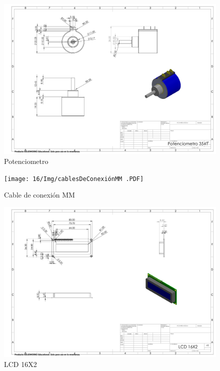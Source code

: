     \begin{figure}[H]
        \centering
        \includegraphics[trim = {10mm 10mm 10mm 10mm},clip,scale=0.150]{16/Img/potenciometro.PDF}
        \caption{Potenciometro}
        \label{fig:Potenciometro}
    \end{figure}
    \begin{figure}[H]
        \centering
        \texttt{[image: 16/Img/cablesDeConexiónMM .PDF]}
        \caption{Cable de conexión MM}
        \label{fig:Cable de conexión MM}
    \end{figure}
    \begin{figure}[H]
        \centering
        \includegraphics[trim = {10mm 10mm 10mm 10mm},clip,scale=0.150]{16/Img/lCD16X2.PDF}
        \caption{LCD 16X2}
        \label{fig:LCD 16X2}
    \end{figure}
